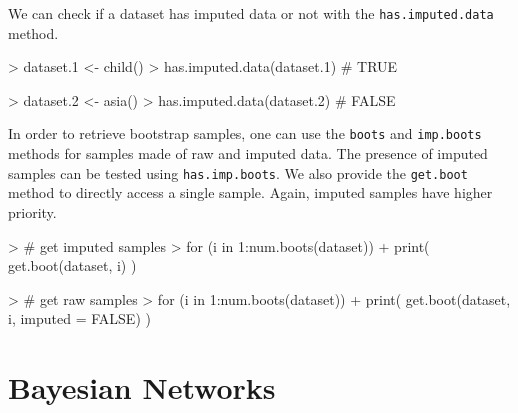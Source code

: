 \documentclass{article}
\newcommand{\Rmethod}[1]{{\texttt{#1}}}
\begin{document}
We can check if a dataset has imputed data or not with the \Rmethod{has.imputed.data} method.
\begin{Schunk}
\begin{Sinput}
> dataset.1 <- child()
> has.imputed.data(dataset.1) # TRUE
\end{Sinput}
\end{Schunk}

\begin{Schunk}
\begin{Sinput}
> dataset.2 <- asia()
> has.imputed.data(dataset.2) # FALSE
\end{Sinput}
\end{Schunk}

In order to retrieve bootstrap samples, one can use the \Rmethod{boots} and \Rmethod{imp.boots} methods for samples
made of raw and imputed data. The presence of imputed samples can be tested using \Rmethod{has.imp.boots}.
We also provide the \Rmethod{get.boot} method to directly access a single sample. Again, imputed samples have higher priority.
\begin{Schunk}
\begin{Sinput}
> # get imputed samples
> for (i in 1:num.boots(dataset))
+   print( get.boot(dataset, i) )
\end{Sinput}
\end{Schunk}

\begin{Schunk}
\begin{Sinput}
> # get raw samples
> for (i in 1:num.boots(dataset))
+   print( get.boot(dataset, i, imputed = FALSE) )
\end{Sinput}
\end{Schunk}

\section{Bayesian Networks}
\end{document}
